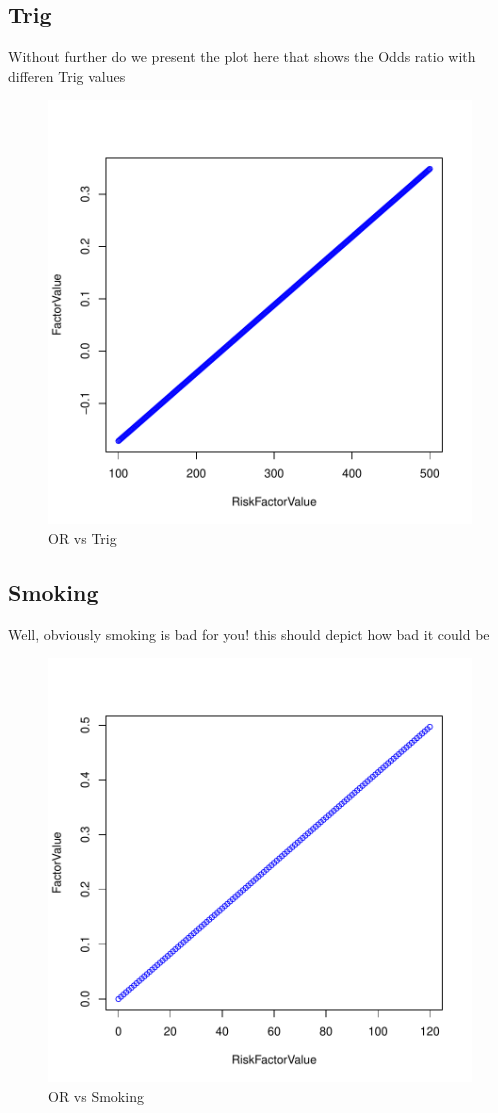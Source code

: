 \documentclass{report}
\begin{document}
\subsection{\color{green}Trig}
Without further do we present the plot here that shows the Odds ratio with differen Trig values
\begin{figure}[H]
\includegraphics{EPFL-trig}
\caption{OR vs Trig}
\end{figure}


\newpage
\subsection{\color{green}Smoking}
Well, obviously smoking is bad for you! this should depict how bad it could be
\begin{figure}[H]
\includegraphics{EPFL-smk}
\caption{OR vs Smoking}
\end{figure}







\end{document}
